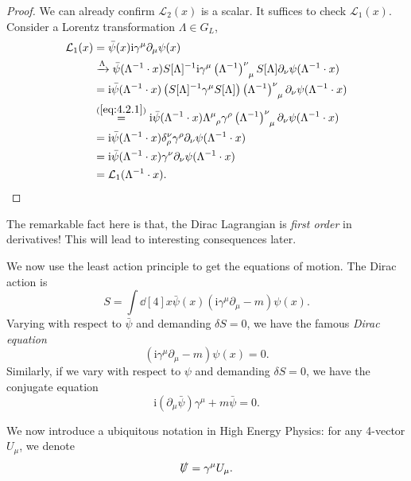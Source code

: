 \documentclass[a4paper,11pt]{article}
\begin{document}
	\begin{proof}
		We can already confirm $\mathcal{L}_2(x)$ is a scalar. It suffices to check $\mathcal{L}_1(x)$. Consider a Lorentz transformation $\Lambda \in G_L$, 
		\begin{align*}
			\mathcal{L}_1(x) & = \bar \psi(x) \mathrm{i} \gamma^\mu \partial_\mu \psi(x)\\
			& \xrightarrow{\Lambda} \bar \psi(\Lambda^{-1} \cdot x) S[\Lambda]^{-1} \mathrm{i} \gamma^\mu \left( \Lambda^{-1} \right)\indices{^\nu_\mu} S[\Lambda] \partial_\nu \psi(\Lambda^{-1} \cdot x)\\
			& = \mathrm{i} \bar \psi(\Lambda^{-1} \cdot x) \left( S[\Lambda]^{-1} \gamma^\mu S[\Lambda] \right) \left( \Lambda^{-1} \right)\indices{^\nu _\mu} \partial_\nu \psi(\Lambda^{-1} \cdot x)\\
			& \overset{(\ref{eq:4.2.1})}{=} \mathrm{i} \bar \psi(\Lambda^{-1} \cdot x) \LT{\mu}{\rho} \gamma^\rho \left( \Lambda^{-1} \right)\indices{^\nu_\mu} \partial_\nu \psi(\Lambda^{-1} \cdot x)\\
			& = \mathrm{i} \bar \psi(\Lambda^{-1} \cdot x) \delta^\nu_\rho \gamma^\rho \partial_\nu \psi(\Lambda^{-1}\cdot x)\\
			& = \mathrm{i} \bar \psi(\Lambda^{-1} \cdot x) \gamma^\nu \partial_\nu \psi(\Lambda^{-1} \cdot x)\\
			& = \mathcal{L}_1 (\Lambda^{-1} \cdot x).
		\end{align*}
		
	\end{proof}

	The remarkable fact here is that, the Dirac Lagrangian is \emph{first order} in derivatives! This will lead to interesting consequences later.

	We now use the least action principle to get the equations of motion. The Dirac action is
	\[
		S = \int \dd[4]{x} \bar \psi(x) \left( \mathrm{i} \gamma^\mu \partial_\mu - m \right) \psi(x).
	\]
	Varying with respect to $\bar \psi$ and demanding $\delta S = 0$, we have the famous \emph{Dirac equation}
	\begin{equation}
		\boxed{\left(\mathrm{i} \gamma^\mu \partial_\mu - m\right)\psi(x) = 0}.
	\end{equation}
	Similarly, if we vary with respect to $\psi$ and demanding $\delta S = 0$, we have the conjugate equation 
	\[
		\mathrm{i} (\partial_\mu \bar \psi) \gamma^\mu + m \bar \psi = 0.
	\]

	We now introduce a ubiquitous notation in High Energy Physics: for any 4-vector $U_\mu$, we denote 
	\[
		\slashed{U} = \gamma^\mu U_\mu.
	\]
	
\end{document}
